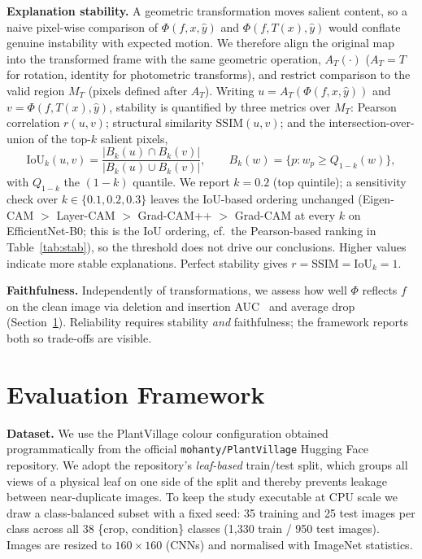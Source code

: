 \documentclass[runningheads]{llncs}
\begin{document}
\smallskip
\noindent\textbf{Explanation stability.} A geometric transformation moves salient
content, so a naive pixel-wise comparison of $\Phi(f,x,\hat{y})$ and
$\Phi(f,T(x),\hat{y})$ would conflate genuine instability with expected motion.
We therefore align the original map into the transformed frame with the same
geometric operation, $A_T(\cdot)$ ($A_T=T$ for rotation, identity for photometric
transforms), and restrict comparison to the valid region
$M_T$ (pixels defined after $A_T$). Writing $u=A_T(\Phi(f,x,\hat{y}))$ and
$v=\Phi(f,T(x),\hat{y})$, stability is quantified by three metrics over $M_T$:
Pearson correlation $r(u,v)$; structural similarity $\mathrm{SSIM}(u,v)$; and the
intersection-over-union of the top-$k$ salient pixels,
\begin{equation}
\mathrm{IoU}_k(u,v)=\frac{|B_k(u)\cap B_k(v)|}{|B_k(u)\cup B_k(v)|},\qquad
B_k(w)=\{p: w_p\ge Q_{1-k}(w)\},
\label{eq:iou}
\end{equation}
with $Q_{1-k}$ the $(1{-}k)$ quantile. We report $k=0.2$ (top quintile); a
sensitivity check over $k\in\{0.1,0.2,0.3\}$ leaves the IoU-based ordering unchanged
(Eigen-CAM $>$ Layer-CAM $>$ Grad-CAM++ $>$ Grad-CAM at every $k$ on
EfficientNet-B0; this is the IoU ordering, cf.\ the Pearson-based ranking in
Table~\ref{tab:stab}), so the threshold does not drive our conclusions. Higher values
indicate more stable explanations. Perfect stability gives $r=\mathrm{SSIM}=\mathrm{IoU}_k=1$.

\smallskip
\noindent\textbf{Faithfulness.} Independently of transformations, we assess how
well $\Phi$ reflects $f$ on the clean image via deletion and insertion
AUC~\cite{petsiuk2018rise} and average drop~\cite{chattopadhay2018gradcampp}
(Section~\ref{sec:method}). Reliability requires stability \emph{and}
faithfulness; the framework reports both so trade-offs are visible.

\section{Evaluation Framework}\label{sec:method}
\noindent\textbf{Dataset.} We use the PlantVillage colour configuration obtained
programmatically from the official \texttt{mohanty/PlantVillage} Hugging Face
repository. We adopt the repository's \emph{leaf-based} train/test split, which
groups all views of a physical leaf on one side of the split and thereby prevents
leakage between near-duplicate images. To keep the study executable at CPU scale
we draw a class-balanced subset with a fixed seed: 35 training and 25 test images
per class across all 38 \{crop, condition\} classes (1{,}330 train / 950 test
images). Images are resized to $160\times160$ (CNNs) and normalised with ImageNet
statistics.
\end{document}
